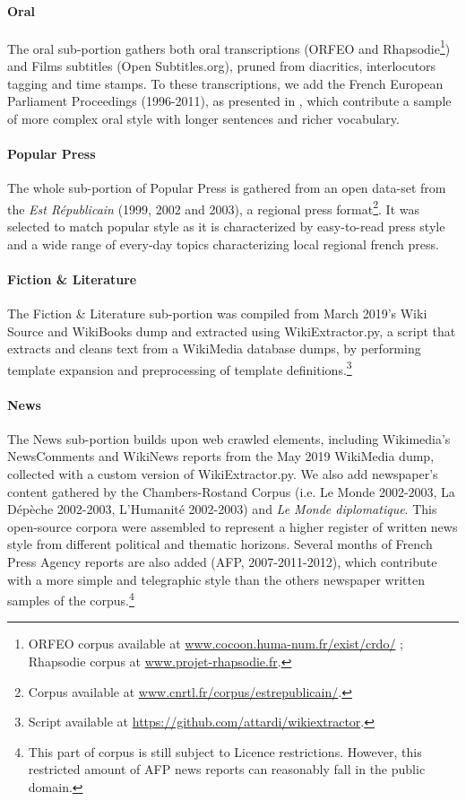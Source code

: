 \paragraph{\Cabernet Oral} \label{subsec:DescribeCaBeRnetOral}
The oral sub-portion gathers both oral transcriptions (\textsc{ORFEO} and Rhapsodie\footnote{\textsc{ORFEO} corpus available at \url{www.cocoon.huma-num.fr/exist/crdo/} ; Rhapsodie corpus at \url{www.projet-rhapsodie.fr}.}) and Films subtitles (Open Subtitles.org), pruned from diacritics, interlocutors tagging and time stamps. To these transcriptions, we add the French European Parliament Proceedings (1996-2011), as presented in \citet{koehn-2005-europarl}, which contribute a sample of more complex oral style with longer sentences and richer vocabulary.

\paragraph{\Cabernet Popular Press} \label{subsec:DescribeCaBeRnetPop}
The whole sub-portion of Popular Press is gathered from an open data-set from the \textit{Est Républicain} (1999, 2002 and 2003), a regional press format\footnote{Corpus available at \url{www.cnrtl.fr/corpus/estrepublicain/}.}. It was selected to match popular style as it is characterized by easy-to-read press style and a wide range of every-day topics characterizing local regional french press.

\paragraph{\Cabernet Fiction \& Literature} \label{subsec:DescribeCaBeRnetFic}
The Fiction \& Literature sub-portion was compiled from March 2019's Wiki Source and WikiBooks dump and extracted using WikiExtractor.py, a script that extracts and cleans text from a WikiMedia database dumps, by performing template expansion and preprocessing of template definitions.\footnote{Script available at \url{https://github.com/attardi/wikiextractor}.}

\paragraph{\Cabernet News} \label{subsec:DescribeCaBeRnetNews}
The News sub-portion builds upon web crawled elements, including Wikimedia's NewsComments and WikiNews reports from the May 2019 WikiMedia dump, collected with a custom version of WikiExtractor.py. We also add newspaper's content gathered by the Chambers-Rostand Corpus (i.e. Le Monde 2002-2003, La Dépèche 2002-2003, L'Humanité 2002-2003) and \emph{Le Monde diplomatique}. This open-source corpora were assembled to represent a higher register of written news style from different political and thematic horizons. Several months of French Press Agency reports are also added (AFP, 2007-2011-2012), which contribute with a more simple and telegraphic style than the others newspaper written samples of the corpus.\footnote{This part of \Cabernet corpus is still subject to Licence restrictions. However, this restricted amount of AFP news reports can reasonably fall in the public domain.}

